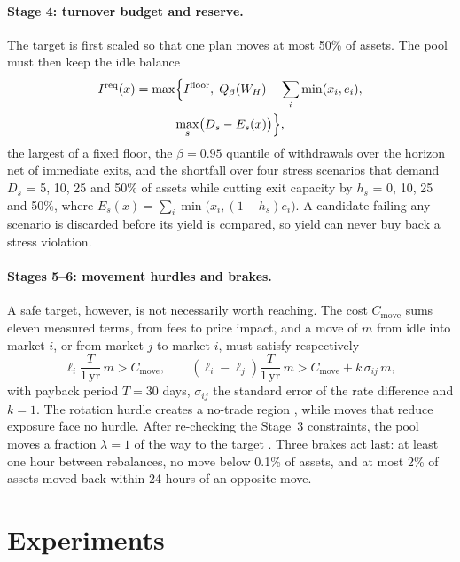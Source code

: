 \documentclass[sigconf]{acmart}
\begin{document}
\paragraph{Stage 4: turnover budget and reserve.}
The target is first scaled so that one plan moves at most 50\% of assets. The pool must then keep the idle balance
\begin{multline}
  I^{\mathrm{req}}(x) = \max\Bigl\{ I^{\mathrm{floor}},\;
    Q_{\beta}(W_H) - \sum_i \min(x_i, e_i),\\
    \max_s \bigl(D_s - E_s(x)\bigr) \Bigr\},
  \label{eq:reserve}
\end{multline}
the largest of a fixed floor, the $\beta = 0.95$ quantile of withdrawals over the horizon net of immediate exits, and the shortfall over four stress scenarios that demand $D_s$ = 5, 10, 25 and 50\% of assets while cutting exit capacity by $h_s$ = 0, 10, 25 and 50\%, where ${E_s(x) = \sum_i \min\bigl(x_i, (1 - h_s) e_i\bigr)}$. A candidate failing any scenario is discarded before its yield is compared, so yield can never buy back a stress violation.

\paragraph{Stages 5--6: movement hurdles and brakes.}
A safe target, however, is not necessarily worth reaching. The cost $C_{\mathrm{move}}$ sums eleven measured terms, from fees to price impact, and a move of $m$ from idle into market $i$, or from market $j$ to market $i$, must satisfy respectively
\begin{equation}
  \ell_i \frac{T}{1\,\mathrm{yr}}\, m > C_{\mathrm{move}}, \qquad
  (\ell_i - \ell_j) \frac{T}{1\,\mathrm{yr}}\, m > C_{\mathrm{move}} + k\,\sigma_{ij}\, m,
  \label{eq:hurdle}
\end{equation}
with payback period $T = 30$ days, $\sigma_{ij}$ the standard error of the rate difference and $k = 1$. The rotation hurdle creates a no-trade region \citep{constantinides1986}, while moves that reduce exposure face no hurdle. After re-checking the Stage~3 constraints, the pool moves a fraction $\lambda = 1$ of the way to the target \citep{garleanu2013}. Three brakes act last: at least one hour between rebalances, no move below 0.1\% of assets, and at most 2\% of assets moved back within 24 hours of an opposite move.

\section{Experiments}
\label{sec:experiments}
\end{document}
